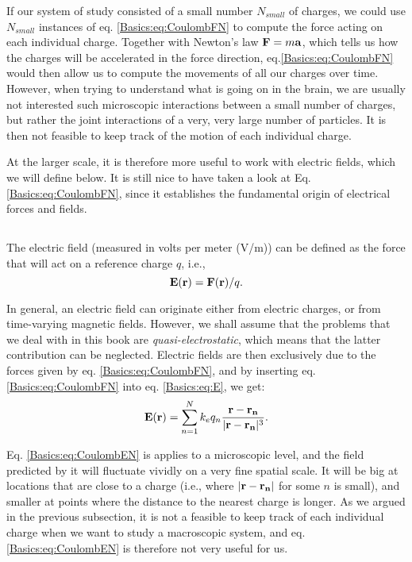If our system of study consisted of a small number $N_{small}$ of charges, we could use $N_{small}$ instances of eq. \ref{Basics:eq:CoulombFN} to compute the force acting on each individual charge. Together with Newton's law ${\bf F} = m {\bf a}$, which tells us how the charges will be accelerated in the force direction, eq.\ref{Basics:eq:CoulombFN} would then allow us to compute the movements of all our charges over time. However, when trying to understand what is going on in the brain, we are usually not interested such microscopic interactions between a small number of charges, but rather the joint interactions of a very, very large number of particles. It is then not feasible to keep track of the motion of each individual charge. 

At the larger scale, it is therefore more useful to work with electric fields, which we will define below. It is still nice to have taken a look at  Eq. \ref{Basics:eq:CoulombFN}, since it establishes the fundamental origin of electrical forces and fields. 


\subsection{}
The electric field (measured in volts per meter (V/m)) can be defined as the force that will act on a reference charge $q$, i.e., 
\begin{equation}
{\bf E}({\bf r}) = {\bf F}({\bf r})/q.
\label{Basics:eq:E}
\end{equation}

In general, an electric field can originate either from electric charges, or from time-varying magnetic fields. However, we shall assume that the problems that we deal with in this book are \textit{quasi-electrostatic}, which means that the latter contribution can be neglected. Electric fields are then exclusively due to the forces given by eq. \ref{Basics:eq:CoulombFN}, and by inserting eq. \ref{Basics:eq:CoulombFN} into eq. \ref{Basics:eq:E}, we get:
\begin{equation}
{\bf E}({\bf r}) = \sum_{n=1}^N k_e q_n \frac{{\bf r}-{\bf r_n}}{|{\bf r}-{\bf r_n}|^3}.
\label{Basics:eq:CoulombEN}
\end{equation}

Eq. \ref{Basics:eq:CoulombEN} is applies to a microscopic level, and the field predicted by it will fluctuate vividly on a very fine spatial scale. It will be big at locations that are close to a charge (i.e., where $|{\bf r}-{\bf r_n}|$ for some $n$ is small), and smaller at points where the distance to the nearest charge is longer. As we argued in the previous subsection, it is not a feasible to keep track of each individual charge when we want to study a macroscopic system, and eq.\ref{Basics:eq:CoulombEN} is therefore not very useful for us.


